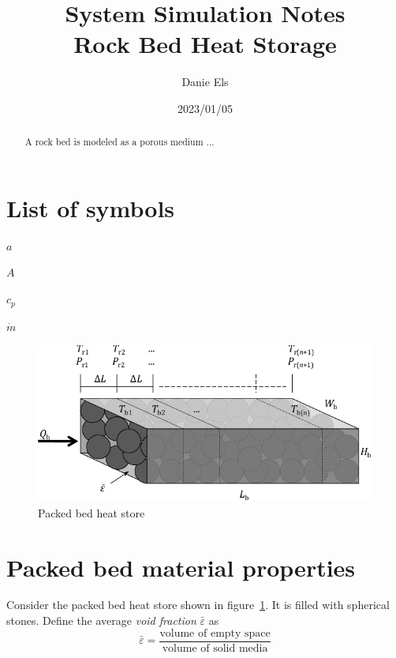 \documentclass[12pt,a4paper]{article}
\title{{\large System Simulation Notes}\\
       \textbf{Rock Bed Heat Storage}}
\author{Danie Els}
\date{2023/01/05}
\newcommand\vf{\bar{\varepsilon}}    %
\begin{document}
\maketitle 
\begin{abstract}
A rock bed is modeled as a porous medium ...
\end{abstract}

\section*{List of symbols}
\begin{Nomencl}[1.0em]
    \item[$a$]        
    \item[$A$]        
    \item[$c_{p}$]    
    \item[$\dot{m}$]  
\end{Nomencl}

\begin{figure}[htbp]
    \centering
    \includegraphics[scale=1]{figs/bed}
     \caption{Packed bed heat store}
    \label{fig:Bed}
\end{figure}

\section{Packed bed material properties}

Consider the packed bed heat store shown in figure~\ref{fig:Bed}. It is filled with
spherical stones. Define the average \emph{void fraction} $\vf$ as
\begin{equation}
    \vf = \frac{\text{volume of empty space}}
               {\text{volume of solid media}}
\end{equation}
\end{document}
